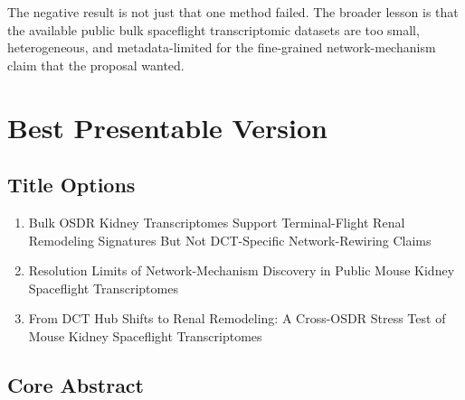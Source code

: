 \documentclass[11pt]{article}
\begin{document}
The negative result is not just that one method failed. The broader lesson is that the available public bulk spaceflight transcriptomic datasets are too small, heterogeneous, and metadata-limited for the fine-grained network-mechanism claim that the proposal wanted.

\section*{Best Presentable Version}

\subsection*{Title Options}

\begin{enumerate}
  \item Bulk OSDR Kidney Transcriptomes Support Terminal-Flight Renal Remodeling Signatures But Not DCT-Specific Network-Rewiring Claims
  \item Resolution Limits of Network-Mechanism Discovery in Public Mouse Kidney Spaceflight Transcriptomes
  \item From DCT Hub Shifts to Renal Remodeling: A Cross-OSDR Stress Test of Mouse Kidney Spaceflight Transcriptomes
\end{enumerate}

\subsection*{Core Abstract}
\end{document}
